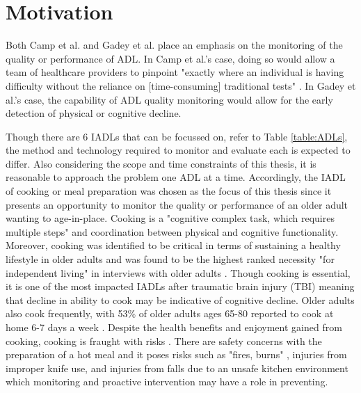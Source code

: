 
\clearpage
\section{Motivation}
Both Camp et al. and Gadey et al. place an emphasis on the monitoring of the quality or performance of ADL. In Camp et al.'s case, doing so would allow a team of healthcare providers to pinpoint "exactly where an individual is having difficulty without the reliance on [time-consuming] traditional tests" \cite{camp_technology_2021}. In Gadey et al.'s case, the capability of ADL quality monitoring would allow for the early detection of physical or cognitive decline.

Though there are 6 IADLs that can be focussed on, refer to Table \ref{table:ADLs}, the method and technology required to monitor and evaluate each is expected to differ. Also considering the scope and time constraints of this thesis, it is reasonable to approach the problem one ADL at a time. Accordingly, the IADL of cooking or meal preparation was chosen as the focus of this thesis since it presents an opportunity to monitor the quality or performance of an older adult wanting to age-in-place. Cooking is a "cognitive complex task, which requires multiple steps" \cite{sikkes_qualitative_2014} and coordination between physical and cognitive functionality. Moreover, cooking was identified to be critical in terms of sustaining a healthy lifestyle in older adults \cite{bouchard_smart_2020} and was found to be the highest ranked necessity "for independent living" in interviews with older adults \cite{dubuc_perceived_2019}. Though cooking is essential, it is one of the most impacted IADLs after traumatic brain injury (TBI) meaning that decline in ability to cook may be indicative of cognitive decline. Older adults also cook frequently, with 53\% of older adults ages 65-80 reported to cook at home 6-7 days a week \cite{malani_joy_2020}. Despite the health benefits and enjoyment gained from cooking, cooking is fraught with risks \cite{yared_cooking_2015}. There are safety concerns with the preparation of a hot meal and it poses risks such as "fires, burns" \cite{dubuc_perceived_2019}, injuries from improper knife use, and injuries from falls due to an unsafe kitchen environment \cite{yared_cooking_2015} which monitoring and proactive intervention may have a role in preventing. 

